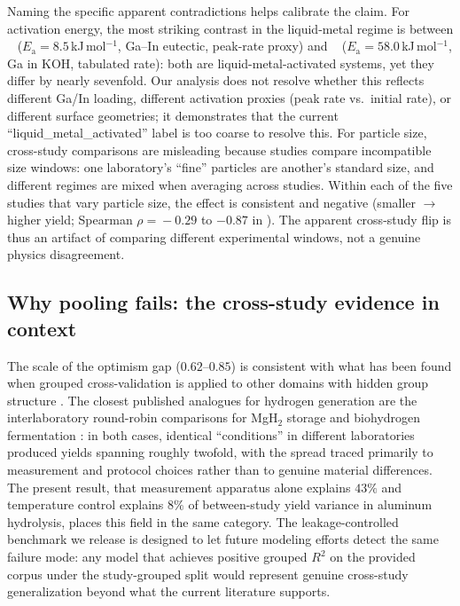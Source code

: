 Naming the specific apparent contradictions helps calibrate the claim. For activation
energy, the most striking contrast in the liquid-metal regime is between
\citeauthor{ilyukhina2012}~\citep{ilyukhina2012} ($E_\mathrm{a}\!=\!8.5$\,kJ\,mol$^{-1}$,
Ga--In eutectic, peak-rate proxy) and \citeauthor{dudoladov2016}~\citep{dudoladov2016}
($E_\mathrm{a}\!=\!58.0$\,kJ\,mol$^{-1}$, Ga in KOH, tabulated rate): both are
liquid-metal-activated systems, yet they differ by nearly sevenfold. Our analysis does
not resolve whether this reflects different Ga/In loading, different activation proxies
(peak rate vs.\ initial rate), or different surface geometries; it demonstrates that the
current ``liquid\_metal\_activated'' label is too coarse to resolve this.
For particle size, cross-study comparisons are misleading because studies compare
incompatible size windows: one laboratory's ``fine'' particles are another's standard
size, and different regimes are mixed when averaging across studies. Within each of the
five studies that vary particle size, the effect is consistent and negative (smaller
$\rightarrow$ higher yield; Spearman $\rho\!=\!-0.29$ to $-0.87$ in
\citep{zhang2024,prabu2021,wen2018,porciuncula2012,deng2010}). The apparent cross-study flip is
thus an artifact of comparing different experimental windows, not a genuine physics
disagreement.

\subsection{Why pooling fails: the cross-study evidence in context}

The scale of the optimism gap ($0.62$--$0.85$) is consistent with what has been found
when grouped cross-validation is applied to other domains with hidden group structure
\citep{bernett2024,john2025}. The closest published analogues for hydrogen generation
are the interlaboratory round-robin comparisons for MgH$_2$ storage \citep{wulf2021} and
biohydrogen fermentation \citep{hoque2018}: in both cases, identical ``conditions'' in
different laboratories produced yields spanning roughly twofold, with the spread traced
primarily to measurement and protocol choices rather than to genuine material differences.
The present result, that measurement apparatus alone explains $43\%$ and temperature
control explains $8\%$ of between-study yield variance in aluminum hydrolysis, places
this field in the same category. The
leakage-controlled benchmark we release is designed to let future modeling efforts detect
the same failure mode: any model that achieves positive grouped $R^2$ on the provided
corpus under the study-grouped split would represent genuine cross-study generalization
beyond what the current literature supports.


